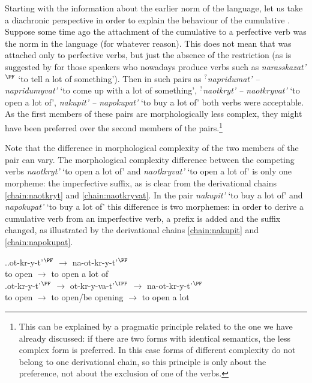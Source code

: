 Starting with the information about the earlier norm of the language, let us take a diachronic perspective in order to explain the behaviour of the cumulative . Suppose some time ago the attachment of the cumulative  to a perfective verb was the norm in the language (for whatever reason). This does not mean that  was attached only to perfective verbs, but just the absence of the restriction (as is suggested by \citet{Tatevosov:13a} for those speakers who nowadays produce verbs such as \textit{narasskazat'}$^{\PF}$ `to tell a lot of something'). Then in such pairs as \textit{$^?$napridumat' -- napridumyvat'} `to come up with a lot of something', \textit{$^?$naotkryt' -- naotkryvat'} `to open a lot of', \textit{nakupit' -- napokupat'} `to buy a lot of' both verbs were acceptable. As the first members of these pairs are morphologically less complex, they might have been preferred over the second members of the pairs.\footnote{This can be explained by a pragmatic principle related to the one we have already discussed: if there are two forms with identical semantics, the less complex form is preferred. In this case forms of different complexity do not belong to one derivational chain, so this principle is only about the preference, not about the exclusion of one of the verbs.} 

Note that the difference in morphological complexity of the two members of the pair can vary. The morphological complexity difference between the competing verbs \textit{naotkryt'} `to open a lot of' and \textit{naotkryvat'} `to open a lot of' is only one morpheme: the imperfective suffix, as is clear from the derivational chains \ref{chain:naotkryt} and \ref{chain:naotkryvat}. In the pair  \textit{nakupit'} `to buy a lot of' and  \textit{napokupat'} `to buy a lot of' this difference is two morphemes: in order to derive a cumulative verb from an imperfective verb, a prefix is added and the suffix changed, as illustrated by the derivational chains \ref{chain:nakupit} and \ref{chain:napokupat}.

\ex.\ag.\label{chain:naotkryt}ot-kr-y-t'$^{\PF}$ $\rightarrow$ na-ot-kr-y-t'$^{\PF}$\\
{to open} $\rightarrow$ {to open a lot of}\\
\bg.\label{chain:naotkryvat}ot-kr-y-t'$^{\PF}$ $\rightarrow$ ot-kr-y-va-t'$^{\IPF}$ $\rightarrow$ na-ot-kr-y-t'$^{\PF}$\\
{to open} $\rightarrow$ {to open/be opening} $\rightarrow$ {to open a lot}\\

